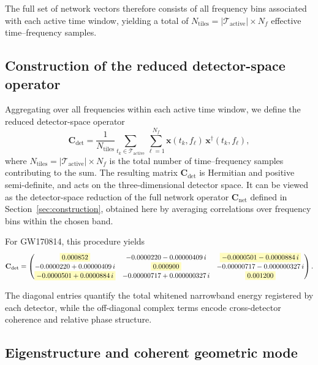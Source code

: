 \documentclass[11pt,a4paper]{article}
\begin{document}
The full set of network vectors therefore consists of all frequency bins associated with each active time window,
yielding a total of $N_{\mathrm{tiles}} = |\mathcal{T}_{\mathrm{active}}| \times N_f$ effective time--frequency samples.

\subsection{Construction of the reduced detector-space operator}

Aggregating over all frequencies within each active time window, we define the reduced detector-space operator
\begin{equation}
\mathbf{C}_{\mathrm{det}}
= \frac{1}{N_{\mathrm{tiles}}}
\sum_{t_k \in \mathcal{T}_{\mathrm{active}}}
\sum_{\ell=1}^{N_f}
\mathbf{x}(t_k,f_\ell)\,
\mathbf{x}^\dagger(t_k,f_\ell),
\end{equation}
where $N_{\mathrm{tiles}} = |\mathcal{T}_{\mathrm{active}}| \times N_f$ is the total number of time--frequency samples contributing to the sum.
The resulting matrix $\mathbf{C}_{\mathrm{det}}$ is Hermitian and positive semi-definite, and acts on the three-dimensional detector space.
It can be viewed as the detector-space reduction of the full network operator $\mathbf{C}_{\mathrm{net}}$ defined in Section~\ref{sec:construction}, obtained here by averaging correlations over frequency bins within the chosen band.


For GW170814, this procedure yields
\begin{equation}
\mathbf{C}_{\mathrm{det}} =
\begin{pmatrix}
 \colorbox{yellow!25}{$0.000852$}
 & -0.0000220 - 0.00000409\,i
 & \colorbox{yellow!25}{$-0.0000501 - 0.0000884\,i$} \\

 -0.0000220 + 0.00000409\,i
 & \colorbox{yellow!25}{$0.000900$}
 & -0.00000717 - 0.000000327\,i \\

 \colorbox{yellow!25}{$-0.0000501 + 0.0000884\,i$}
 & -0.00000717 + 0.000000327\,i
 & \colorbox{yellow!25}{$0.001200$}
\end{pmatrix}.
\end{equation}


The diagonal entries quantify the total whitened narrowband energy registered by each detector, while the off-diagonal complex terms encode cross-detector coherence and relative phase structure.

\subsection{Eigenstructure and coherent geometric mode}
\end{document}
